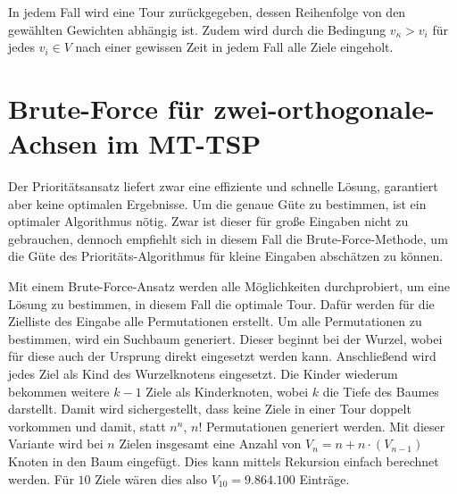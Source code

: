 \documentclass[german,version-2019-11]{uzl-thesis}
\begin{document}
In jedem Fall wird eine Tour zurückgegeben, dessen Reihenfolge von den gewählten Gewichten abhängig ist. Zudem wird durch die Bedingung $v_\kappa>v_i$ für jedes $v_i\in V$ nach einer gewissen Zeit in jedem Fall alle Ziele eingeholt.

\section{Brute-Force für zwei-orthogonale-Achsen im MT-TSP}

Der Prioritätsansatz liefert zwar eine effiziente und schnelle Lösung, garantiert aber keine optimalen Ergebnisse. Um die genaue Güte zu bestimmen, ist ein optimaler Algorithmus nötig. Zwar ist dieser für große Eingaben nicht zu gebrauchen, dennoch empfiehlt sich in diesem Fall die Brute-Force-Methode, um die Güte des Prioritäts-Algorithmus für kleine Eingaben abschätzen zu können. 

Mit einem Brute-Force-Ansatz werden alle Möglichkeiten durchprobiert, um eine Lösung zu bestimmen, in diesem Fall die optimale Tour. Dafür werden für die Zielliste des Eingabe alle Permutationen erstellt. Um alle Permutationen zu bestimmen, wird ein Suchbaum generiert. Dieser beginnt bei der Wurzel, wobei für diese auch der Ursprung direkt eingesetzt werden kann. Anschließend wird jedes Ziel als Kind des Wurzelknotens eingesetzt. Die Kinder wiederum bekommen weitere $k-1$ Ziele als Kinderknoten, wobei $k$ die Tiefe des Baumes darstellt. Damit wird sichergestellt, dass keine Ziele in einer Tour doppelt vorkommen und damit, statt $n^n$, $n!$ Permutationen generiert werden. Mit dieser Variante wird bei $n$ Zielen insgesamt eine Anzahl von $V_n = n + n\cdot (V_{n-1})$ Knoten in den Baum eingefügt. Dies kann mittels Rekursion einfach berechnet werden. Für $10$ Ziele wären dies also $V_{10}=9.864.100$ Einträge.
\end{document}
